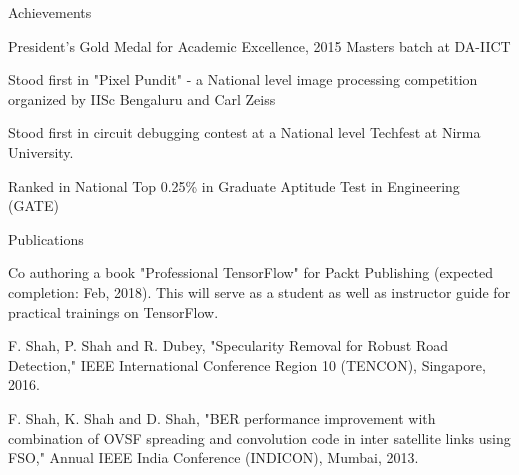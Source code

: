 \documentclass{resume} %
\begin{document}
	
	
	\begin{rSection}{Achievements} \itemsep -2pt
		\item President's Gold Medal for Academic Excellence, 2015 Masters batch at DA-IICT
		\item Stood first in "Pixel Pundit" - a National level image processing competition organized by IISc Bengaluru and Carl Zeiss
		\item Stood first in circuit debugging contest at a National level Techfest at Nirma
		University.
		\item Ranked in National Top 0.25\% in Graduate Aptitude Test in Engineering (GATE)

	\end{rSection}
	

	\begin{rSection}{Publications}
		\item Co authoring a book "Professional TensorFlow" for Packt Publishing (expected completion: Feb, 2018). This will serve as a student as well as instructor guide for practical trainings on TensorFlow. 
		\item F. Shah, P. Shah and R. Dubey, "Specularity Removal for Robust Road Detection," IEEE International Conference Region 10 (TENCON), Singapore, 2016.
		\item F. Shah, K. Shah and D. Shah, "BER performance improvement with combination of OVSF spreading and convolution code in inter satellite links using FSO," Annual IEEE India Conference (INDICON), Mumbai, 2013.
	\end{rSection}
		
\end{document}
